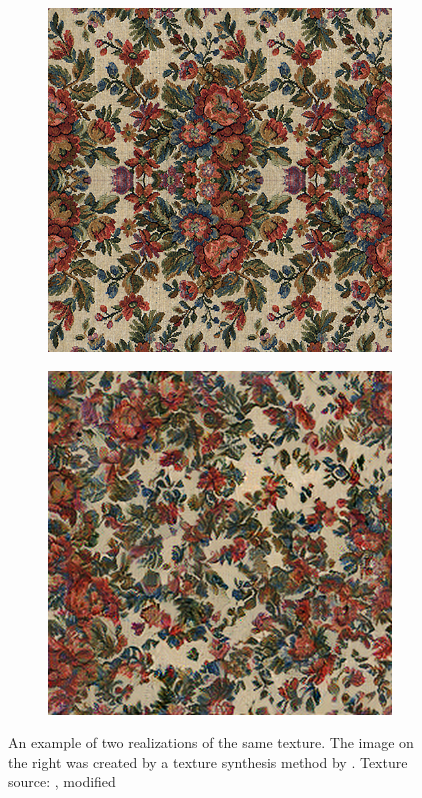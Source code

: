 \begin{figure}[ht]
    \centering
    \begin{subfigure}[b]{0.48\textwidth}
        \centering
        \includegraphics[width=\textwidth]{images/02-flowers1.png}
        \caption*{}
    \end{subfigure}
    \hfill
    \begin{subfigure}[b]{0.48\textwidth}
        \centering
        \includegraphics[width=\textwidth]{images/02-flowers2.png}
        \caption*{}
    \end{subfigure}
    \caption{An example of two realizations of the same texture. The image on the right was created by a texture synthesis method by \citet{Gatys2015}. Texture source: \citet{Pixar128}, modified}
    \label{fig:background_similar_textures}
\end{figure}

